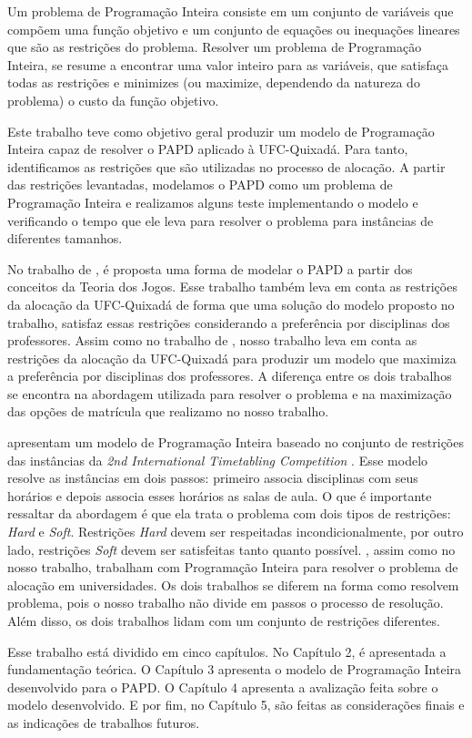 Um problema de Programação Inteira consiste em um conjunto de variáveis que compõem uma função objetivo e um conjunto de equações ou inequações lineares que são as restrições do problema. Resolver um problema de Programação Inteira, se resume a encontrar uma valor inteiro para as variáveis, que satisfaça todas as restrições e minimizes (ou maximize, dependendo da natureza do problema) o custo da função objetivo.

Este trabalho teve como objetivo geral produzir um modelo de Programação Inteira capaz de resolver o PAPD aplicado à UFC-Quixadá. Para tanto, identificamos as restrições que são utilizadas no processo de alocação. A partir das restrições levantadas, modelamos o PAPD como um problema de Programação Inteira e realizamos alguns teste implementando o modelo e verificando o tempo que ele leva para resolver o problema para instâncias de diferentes tamanhos.

No trabalho de , é proposta uma forma de modelar o PAPD a partir dos conceitos da Teoria dos Jogos. Esse trabalho também leva em conta as restrições da alocação da UFC-Quixadá de forma que uma solução do modelo proposto no trabalho, satisfaz essas restrições considerando a preferência por disciplinas dos professores. Assim como no trabalho de , nosso trabalho leva em conta as restrições da alocação da UFC-Quixadá para produzir um modelo que maximiza a preferência por disciplinas dos professores. A diferença entre os dois trabalhos se encontra na abordagem utilizada para resolver o problema e na maximização das opções de matrícula que realizamo no nosso trabalho. 

 apresentam um modelo de Programação Inteira baseado no conjunto de restrições das instâncias da \textit{2nd International Timetabling Competition} \cite{itc}. Esse modelo resolve as instâncias em dois passos: primeiro  associa disciplinas com seus horários e depois associa esses horários as salas de aula. O que é importante ressaltar da abordagem é que ela trata o problema com dois tipos de restrições: \textit{Hard} e \textit{Soft}. Restrições \textit{Hard} devem ser respeitadas incondicionalmente, por outro lado, restrições \textit{Soft} devem ser satisfeitas tanto quanto possível. , assim como no nosso trabalho, trabalham com Programação Inteira para resolver o problema de alocação em universidades. Os dois trabalhos se diferem na forma como resolvem problema, pois o nosso trabalho não divide em passos o processo de resolução. Além disso, os dois trabalhos lidam com um conjunto de restrições diferentes.

Esse trabalho está dividido em cinco capítulos. No Capítulo 2, é apresentada a fundamentação teórica. O Capítulo 3 apresenta o modelo de Programação Inteira desenvolvido para o PAPD. O Capítulo 4 apresenta a avalização feita sobre o modelo desenvolvido. E por fim, no Capítulo 5, são feitas as considerações finais e as indicações de trabalhos futuros.

	